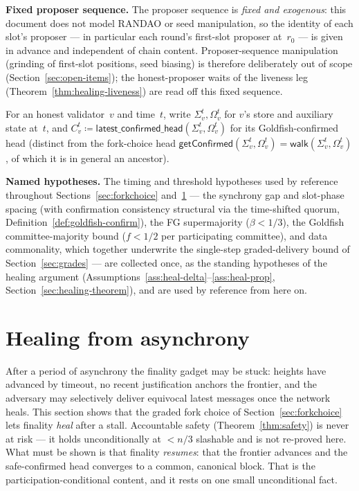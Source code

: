 \ifx\litemode\undefined\documentclass{article}\fi
\newcommand{\getConfirmed}{\textsf{getConfirmed}\xspace}
\newcommand{\rzero}{\ensuremath{r_{0}}}                 %
\newcommand{\walk}{\textsf{walk}\xspace}
\newcommand{\latestConfirmed}{\textsf{latest\_confirmed\_head}\xspace}
\renewcommand{\paragraph}[1]{\vspace{7pt}\noindent\textbf{#1}}
\theoremstyle{plain}
\theoremstyle{definition}
\theoremstyle{remark}
\begin{document}
\paragraph{Fixed proposer sequence.}
The proposer sequence is \emph{fixed and exogenous}: this document does not
model RANDAO or seed manipulation, so the identity of each slot's proposer ---
in particular each round's first-slot proposer at~$\rzero$ --- is given in
advance and independent of chain content.  Proposer-sequence manipulation
(grinding of first-slot positions, seed biasing) is therefore deliberately out
of scope (Section~\ref{sec:open-items}); the honest-proposer waits of the
liveness leg (Theorem~\ref{thm:healing-liveness}) are read off this fixed
sequence.

For an honest validator~$v$ and time~$t$, write $\Sigma_v^t, \Omega_v^t$ for
$v$'s store and auxiliary state at~$t$, and $C_v^t \coloneqq
\latestConfirmed(\Sigma_v^t, \Omega_v^t)$ for its Goldfish-confirmed head
(distinct from the fork-choice head $\getConfirmed(\Sigma_v^t, \Omega_v^t) =
\walk(\Sigma_v^t, \Omega_v^t)$, of which it is in general an ancestor).

\paragraph{Named hypotheses.}
The timing and threshold hypotheses used by reference throughout
Sections~\ref{sec:forkchoice} and~\ref{sec:healing} --- the synchrony gap
and slot-phase spacing (with confirmation consistency structural via the
time-shifted quorum, Definition~\ref{def:goldfish-confirm}), the FG
supermajority (\(\beta < 1/3\)), the Goldfish committee-majority bound
(\(f < 1/2\) per participating committee), and data commonality, which together
underwrite the single-step graded-delivery bound of
Section~\ref{sec:grades} --- are collected once, as the standing hypotheses of
the healing argument (Assumptions~\ref{ass:heal-delta}--\ref{ass:heal-prop},
Section~\ref{sec:healing-theorem}), and are used by reference from here on.

\section{Healing from asynchrony}\label{sec:healing}

After a period of asynchrony the finality gadget may be stuck: heights have
advanced by timeout, no recent justification anchors the frontier, and the
adversary may selectively deliver equivocal latest messages once the network
heals.
This section shows that the graded fork choice of
Section~\ref{sec:forkchoice} lets finality \emph{heal} after a stall.  Accountable
safety (Theorem~\ref{thm:safety}) is never at risk --- it holds unconditionally at
\(<n/3\) slashable and is not re-proved here.  What must be shown is that finality
\emph{resumes}: that the frontier advances and the safe-confirmed head converges to
a common, canonical block.  That is the participation-conditional content, and it
rests on one small unconditional fact.
\end{document}
